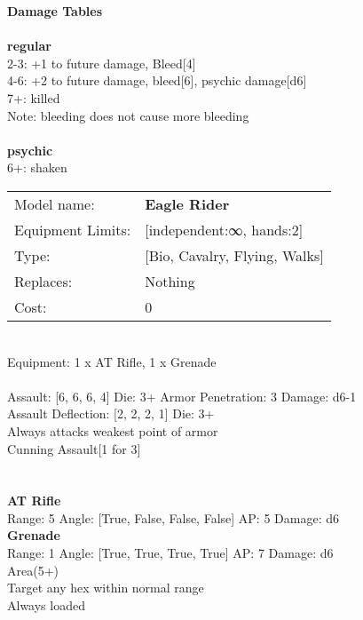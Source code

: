{\bf Damage Tables} \\
\ \\ {\bf regular } \\
2-3: +1 to future damage, Bleed[4] \\
4-6: +2 to future damage, bleed[6], psychic damage[d6] \\
7+: killed \\
Note: bleeding does not cause more bleeding \\
\ \\ {\bf psychic } \\
6+: shaken \\


\noindent
\begin{tabular}{ll}
Model name: &{\bf Eagle Rider } \\
Equipment Limits: &[independent:∞, hands:2] \\
Type: &[Bio, Cavalry, Flying, Walks] \\
Replaces: &Nothing \\
Cost: & 0\\
\end{tabular}
\ \\
Equipment: 1 x AT Rifle, 1 x Grenade \\
\ \\
Assault: [6, 6, 6, 4] Die: 3+ Armor Penetration: 3 Damage: d6-1 \\
Assault Deflection: [2, 2, 2, 1] Die: 3+\\
\indent Always attacks weakest point of armor\\ 
Cunning Assault[1 for 3]\\ 
 
\ \\

\ \\
{\bf AT Rifle } \\



Range: 5  Angle: [True, False, False, False] AP: 5 Damage: d6 \\




{\bf Grenade } \\



Range: 1  Angle: [True, True, True, True] AP: 7 Damage: d6 \\
Area(5+)\\ 
Target any hex within normal range\\ 
Always loaded\\ 




